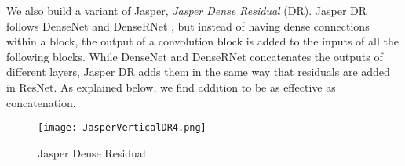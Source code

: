\documentclass[a4paper]{article}
\begin{document}
{\renewcommand{\arraystretch}{1.1}
\begin{table}[!h]
\caption{Jasper 10x5: 10 blocks, each consisting of 5 1D-convolutional sub-blocks, plus 4 additional blocks.
}

\label{tab:JasperParams}
\centering
{}
\end{table}
}

We also build a variant of Jasper, \textit{Jasper Dense Residual} (DR). Jasper DR follows DenseNet \cite{huang2016} and DenseRNet \cite{Tang2018}, but instead of having dense connections within a block, the output of a convolution block is added to the inputs of all the following blocks. While DenseNet and DenseRNet concatenates the outputs of different layers, Jasper DR adds them in the same way that residuals are added in ResNet. As explained below, we find addition to be as effective as concatenation.

\begin{figure}[t]
  \centering
  \texttt{[image: JasperVerticalDR4.png]}
  \caption{Jasper Dense Residual}
  \label{fig:jasper_dense}
\end{figure}
\end{document}
